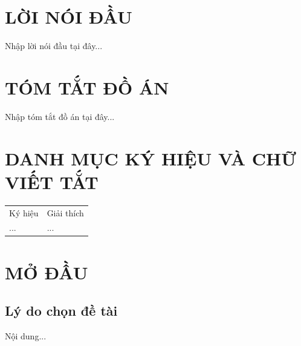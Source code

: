 \documentclass{article} %
\begin{document}
\tableofcontents
\thispagestyle{empty}
\cleardoublepage

{}
{\let\oldnumberline\numberline
    \renewcommand{\numberline}{Bảng~\oldnumberline}
    \listoftables}
\newpage


\section*{LỜI NÓI ĐẦU}
\thispagestyle{empty}
Nhập lời nói đầu tại đây...
\cleardoublepage

\section*{TÓM TẮT ĐỒ ÁN}
Nhập tóm tắt đồ án tại đây...
\cleardoublepage

\section*{DANH MỤC KÝ HIỆU VÀ CHỮ VIẾT TẮT}
 {}

\begin{tabular}{ l l }
    \hspace{1cm} Ký hiệu & \hspace{4cm} Giải thích \\
    \hspace{1cm} ...     & \hspace{4cm} ...        \\
\end{tabular}

\newpage


\section{MỞ ĐẦU}

\subsection{Lý do chọn đề tài}
Nội dung...
\end{document}
